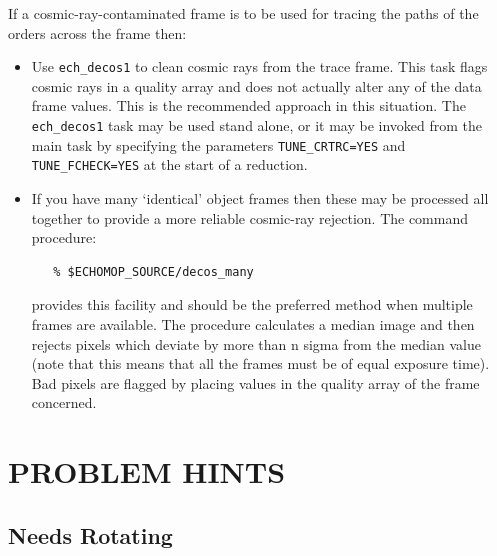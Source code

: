 \documentclass[11pt,twoside]{article}
\makeatletter
\newcommand{\stardocinitials}  {SUN}
\newcommand{\stardocnumber}    {152.4}
\newcommand{\stardocname}{\stardocinitials /\stardocnumber}
\newcommand{\htmlref}[2]{#1}
\newcommand{\xlabel}[1]{}
\newcommand{\mlabel}[1]{\xlabel{#1}\label{#1}}
\newcommand{\myindex}[1]{\index{#1}}
\newcommand{\indexcmdname}[1]{\index{#1@\protect\cmdname{#1}}}
\renewcommand{\myindex}[1]{}
\renewcommand{\indexcmdname}[1]{}
\newcommand{\cmdname}{\begingroup \catcode`\_=12 \realcmdname}
\newcommand{\realcmdname}[1]{\endgroup\texttt{#1}}
\makeatother
\begin{document}
\myindex{Cosmic rays}
If a cosmic-ray-contaminated frame is to be used for tracing the
paths of the orders across the frame then:

\begin{itemize}
\indexcmdname{ECH_DECOS1}
\indexcmdname{TUNE_CRTRC}

\item Use \htmlref{{\tt ech\_decos1}}{ech_decos1} to clean cosmic rays
      from the trace frame.
      This task flags cosmic rays in a quality array and does not actually
      alter any of the data frame values. This is the recommended approach
      in this situation. The \texttt{ech\_decos1} task may be used stand alone,
      or it may be invoked from the main task by specifying the
      parameters \htmlref{{\tt{TUNE\_CRTRC=YES}}}{par_TUNE_CRTRC} and
      \htmlref{{\tt{TUNE\_FCHECK=YES}}}{par_TUNE_FCHECK} at the
      start of a reduction.

\item If you have many `identical' object frames then these may be
      processed all together to provide a more reliable cosmic-ray
      rejection. The command procedure:

\begin{verbatim}
   % $ECHOMOP_SOURCE/decos_many
\end{verbatim}

      \myindex{Exposure duration}
      provides this facility and should be the preferred method when
      multiple frames are available. The procedure calculates a median
      image and then rejects pixels which deviate by more than n sigma from
      the median value (note that this means that all the frames must be of
      equal exposure time). Bad pixels are flagged by placing values in the
      quality array of the frame concerned.

\end{itemize}


\newpage
\section{\mlabel{hints}PROBLEM HINTS}
\markboth{PROBLEM HINTS}{\stardocname}

\subsection{\mlabel{needs_rotating} Needs Rotating}
\myindex{Frame!rotation}
\end{document}
